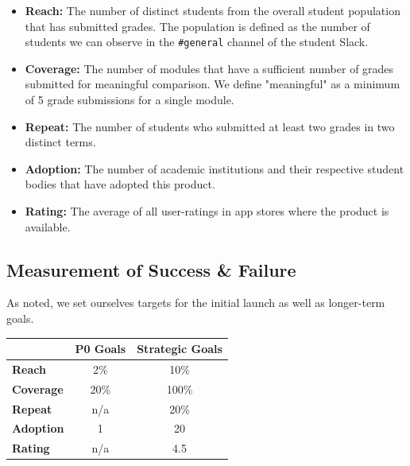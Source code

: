 \begin{itemize}
    \item \textbf{Reach:} The number of distinct students from the overall student population that has submitted grades. The population is defined as the number of students we can observe in the \texttt{#general} channel of the student Slack. 
    \item \textbf{Coverage:} The number of modules that have a sufficient number of grades submitted for meaningful comparison. We define "meaningful" as a minimum of 5 grade submissions for a single module.
    \item \textbf{Repeat:} The number of students who submitted at least two grades in two distinct terms.
    \item \textbf{Adoption:} The number of academic institutions and their respective student bodies that have adopted this product.
   \item \textbf{Rating:} The average of all user-ratings in app stores where the product is available.
\end{itemize}

\subsection{Measurement of Success \& Failure}
As noted, we set ourselves targets for the initial launch as well as longer-term goals.

\begin{table}[H]
\centering
\begin{tabular}{@{}lcc@{}}
\toprule
                  & \multicolumn{1}{l}{\textbf{P0 Goals}} & \multicolumn{1}{l}{\textbf{Strategic Goals}} \\ \midrule
\textbf{Reach}    & 2\%                                   & 10\%                                         \\
\textbf{Coverage} & 20\%                                  & 100\%                                        \\
\textbf{Repeat}   & n/a                                   & 20\%                                         \\
\textbf{Adoption} & 1                                     & 20                                           \\
\textbf{Rating}   & n/a                                   & 4.5                                          \\ \bottomrule
\end{tabular}
\end{table}

 



